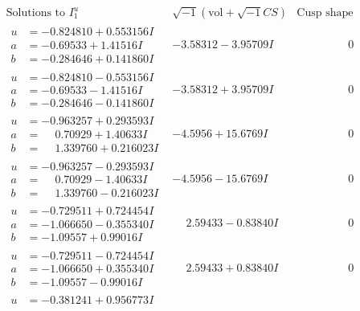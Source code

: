 \documentclass[1p]{elsarticle_modified}
\theoremstyle{definition}
\newcommand{\I}{\sqrt{-1}}
\begin{document}
$$\begin{array}{c|c|c}  
\text{Solutions to }I^u_{1}& \I (\text{vol} + \sqrt{-1}CS) & \text{Cusp shape}\\
 \hline 
\begin{aligned}
u &= -0.824810 + 0.553156 I \\
a &= -0.69533 + 1.41516 I \\
b &= -0.284646 + 0.141860 I\end{aligned}
 & -3.58312 - 3.95709 I & \phantom{-0.000000 } 0 \\ \hline\begin{aligned}
u &= -0.824810 - 0.553156 I \\
a &= -0.69533 - 1.41516 I \\
b &= -0.284646 - 0.141860 I\end{aligned}
 & -3.58312 + 3.95709 I & \phantom{-0.000000 } 0 \\ \hline\begin{aligned}
u &= -0.963257 + 0.293593 I \\
a &= \phantom{-}0.70929 + 1.40633 I \\
b &= \phantom{-}1.339760 + 0.216023 I\end{aligned}
 & -4.5956 + 15.6769 I & \phantom{-0.000000 } 0 \\ \hline\begin{aligned}
u &= -0.963257 - 0.293593 I \\
a &= \phantom{-}0.70929 - 1.40633 I \\
b &= \phantom{-}1.339760 - 0.216023 I\end{aligned}
 & -4.5956 - 15.6769 I & \phantom{-0.000000 } 0 \\ \hline\begin{aligned}
u &= -0.729511 + 0.724454 I \\
a &= -1.066650 - 0.355340 I \\
b &= -1.09557 + 0.99016 I\end{aligned}
 & \phantom{-}2.59433 - 0.83840 I & \phantom{-0.000000 } 0 \\ \hline\begin{aligned}
u &= -0.729511 - 0.724454 I \\
a &= -1.066650 + 0.355340 I \\
b &= -1.09557 - 0.99016 I\end{aligned}
 & \phantom{-}2.59433 + 0.83840 I & \phantom{-0.000000 } 0 \\ \hline\begin{aligned}
u &= -0.381241 + 0.956773 I \\

\end{aligned}
\end{array}$$
\end{document}
